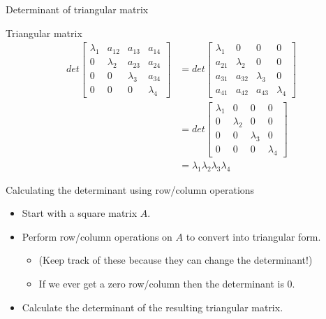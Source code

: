 \documentclass{beamer}
\begin{document}
\begin{frame}{Determinant of triangular matrix}
  \begin{example}{Triangular matrix}
    \begin{align*}
      det
      \left[
	\begin{array}{cccc}
          \lambda_1 &a_{12}&a_{13}&a_{14}\\
          0&\lambda_2&a_{23}&a_{24}\\
          0&0&\lambda_3&a_{34}\\
          0&0&0&\lambda_4
	\end{array}
      \right] &=
      det
      \left[
	\begin{array}{cccc}
          \lambda_1 &0&0&0\\
          a_{21}&\lambda_2&0&0\\
          a_{31}&a_{32}&\lambda_3&0\\
          a_{41}&a_{42}&a_{43}&\lambda_4
	\end{array}
                                \right] \\
                    &=det
      \left[
	\begin{array}{cccc}
          \lambda_1 &0&0&0\\
          0&\lambda_2&0&0\\
          0&0&\lambda_3&0\\
          0&0&0&\lambda_4
	\end{array}
                 \right]\\
                    &=
      \lambda_1\lambda_2\lambda_3\lambda_4
    \end{align*}
  \end{example}
\end{frame}

\begin{frame}{Calculating the determinant using row/column operations}
  \begin{itemize}
  \item Start with a square matrix $A$.\vfill
  \item Perform row/column operations on $A$ to convert into triangular form.
    \begin{itemize}
    \item (Keep track of these because they can change the determinant!)
    \item If we ever get a zero row/column then the determinant is $0$.
    \end{itemize}\vfill
  \item Calculate the determinant of the resulting triangular matrix.
  \end{itemize}
\end{frame}
\end{document}
